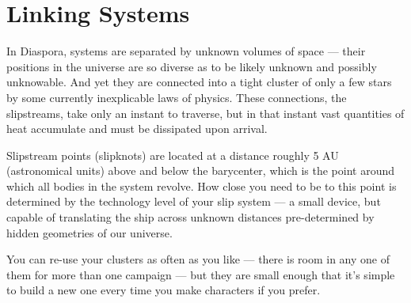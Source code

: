\section{Linking Systems}\label{sec:linking-systems} %

In Diaspora, systems are separated by unknown volumes of space --- their positions in the universe are so diverse as to be likely unknown and possibly unknowable. And yet they are connected into a tight cluster of only a few stars by some currently inexplicable laws of physics. These connections, the slipstreams, take only an instant to traverse, but in that instant vast quantities of heat accumulate and must be dissipated upon arrival.

Slipstream points (slipknots) are located at a distance roughly 5 AU (astronomical units) above and below the barycenter, which is the point around which all bodies in the system revolve. How close you need to be to this point is determined by the technology level of your slip system --- a small device, but capable of translating the ship across unknown distances pre-determined by hidden geometries of our universe.

You can re-use your clusters as often as you like --- there is room in any one of them for more than one campaign --- but they are small enough that it's simple to build a new one every time you make characters if you prefer.

